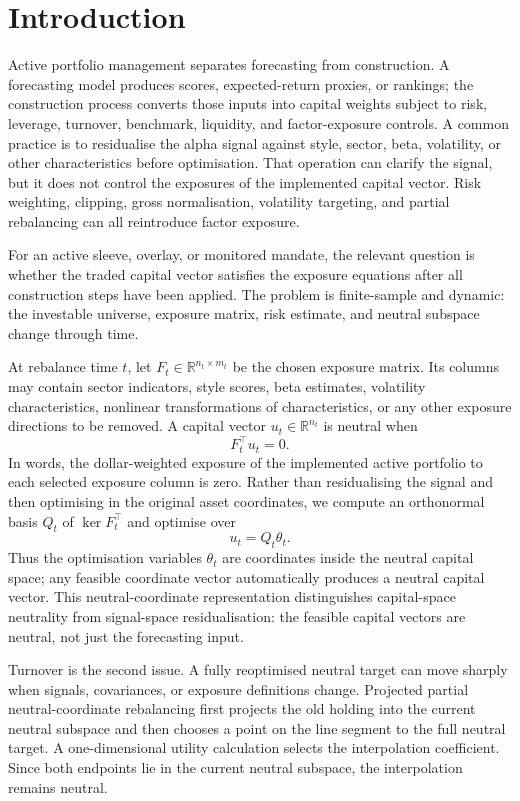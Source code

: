 \documentclass[11pt]{article}
\newcommand{\R}{\mathbb{R}}
\begin{document}
\section{Introduction}

Active portfolio management separates forecasting from construction.  A forecasting model produces
scores, expected-return proxies, or rankings; the construction process converts those inputs into capital
weights subject to risk, leverage, turnover, benchmark, liquidity, and factor-exposure controls.  A common
practice is to residualise the alpha signal against style, sector, beta, volatility, or other characteristics
before optimisation.  That operation can clarify the signal, but it does not control the exposures of the
implemented capital vector.  Risk weighting, clipping, gross normalisation, volatility targeting, and
partial rebalancing can all reintroduce factor exposure.

For an active sleeve, overlay, or monitored mandate, the relevant question is whether the traded capital
vector satisfies the exposure equations after all construction steps have been applied.  The problem is
finite-sample and dynamic: the investable universe, exposure matrix, risk estimate, and neutral subspace
change through time.

At rebalance time $t$, let $F_t\in\R^{n_t\times m_t}$ be the chosen exposure matrix.  Its columns may
contain sector indicators, style scores, beta estimates, volatility characteristics, nonlinear transformations
of characteristics, or any other exposure directions to be removed.  A capital vector $u_t\in\R^{n_t}$ is
neutral when
\[
        F_t^\top u_t=0.
\]
In words, the dollar-weighted exposure of the implemented active portfolio to each selected exposure
column is zero.
Rather than residualising the signal and then optimising in the original asset coordinates, we compute an
orthonormal basis $Q_t$ of $\ker F_t^\top$ and optimise over
\[
        u_t=Q_t\theta_t.
\]
Thus the optimisation variables $\theta_t$ are coordinates inside the neutral capital space; any feasible
coordinate vector automatically produces a neutral capital vector.
This neutral-coordinate representation distinguishes capital-space neutrality from signal-space
residualisation: the feasible capital vectors are neutral, not just the forecasting input.

Turnover is the second issue.  A fully reoptimised neutral target can move sharply when signals,
covariances, or exposure definitions change.  Projected partial neutral-coordinate rebalancing first projects the old
holding into the current neutral subspace and then chooses a point on the line segment to the full
neutral target.  A one-dimensional utility calculation selects the interpolation coefficient.  Since both
endpoints lie in the current neutral subspace, the interpolation remains neutral.
\end{document}

